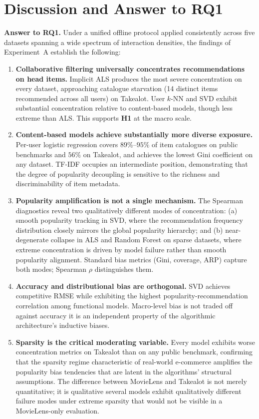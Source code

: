 \documentclass[11pt,a4paper]{report}
\begin{document}
\section{Discussion and Answer to RQ1}
\label{sec:expa_discussion}

\textbf{Answer to RQ1.} Under a unified offline protocol applied consistently across five datasets spanning a wide spectrum of interaction densities, the findings of Experiment~A establish the following:

\begin{enumerate}
    \item \textbf{Collaborative filtering universally concentrates recommendations on head items.} Implicit ALS produces the most severe concentration on every dataset, approaching catalogue starvation (14 distinct items recommended across all users) on Takealot. User $k$-NN and SVD exhibit substantial concentration relative to content-based models, though less extreme than ALS. This supports \textbf{H1} at the macro scale.

    \item \textbf{Content-based models achieve substantially more diverse exposure.} Per-user logistic regression covers $89\%$--$95\%$ of item catalogues on public benchmarks and $56\%$ on Takealot, and achieves the lowest Gini coefficient on any dataset. TF-IDF occupies an intermediate position, demonstrating that the degree of popularity decoupling is sensitive to the richness and discriminability of item metadata.

    \item \textbf{Popularity amplification is not a single mechanism.} The Spearman diagnostics reveal two qualitatively different modes of concentration: (a) smooth popularity tracking in SVD, where the recommendation frequency distribution closely mirrors the global popularity hierarchy; and (b) near-degenerate collapse in ALS and Random Forest on sparse datasets, where extreme concentration is driven by model failure rather than smooth popularity alignment. Standard bias metrics (Gini, coverage, ARP) capture both modes; Spearman $\rho$ distinguishes them.

    \item \textbf{Accuracy and distributional bias are orthogonal.} SVD achieves competitive RMSE while exhibiting the highest popularity-recommendation correlation among functional models. Macro-level bias is not traded off against accuracy it is an independent property of the algorithmic architecture's inductive biases.

    \item \textbf{Sparsity is the critical moderating variable.} Every model exhibits worse concentration metrics on Takealot than on any public benchmark, confirming that the sparsity regime characteristic of real-world e-commerce amplifies the popularity bias tendencies that are latent in the algorithms' structural assumptions. The difference between MovieLens and Takealot is not merely quantitative; it is qualitative several models exhibit qualitatively different failure modes under extreme sparsity that would not be visible in a MovieLens-only evaluation.
\end{enumerate}
\end{document}
